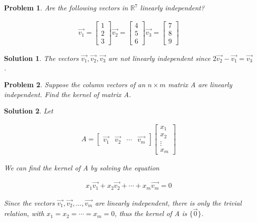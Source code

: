 \documentclass{article}
\newtheorem{problem}{Problem}
\newtheorem*{solution}{Solution}
\begin{document}
\begin{problem}
Are the following vectors in $\mathbb{R}^7$ linearly independent?

\begin{align*}
\vec{v_{1}} = \begin{bmatrix} 1 \\ 2 \\ 3 \end{bmatrix}
\vec{v_{2}} = \begin{bmatrix} 4 \\ 5 \\ 6 \end{bmatrix}
\vec{v_{3}} = \begin{bmatrix} 7 \\ 8 \\ 9 \end{bmatrix}
\end{align*}
\end{problem}

\begin{solution}
The vectors $\vec{v_{1}}, \vec{v_{2}}, \vec{v_{3}}$ are not linearly independent since $2\vec{v_{2}} - \vec{v_{1}} = \vec{v_{3}}$.
\end{solution}

\begin{problem}
Suppose the column vectors of an $n \times m$ matrix A are linearly independent. Find the kernel of matrix A.
\end{problem}

\begin{solution}
Let 

\begin{align*} 
A = \begin{bmatrix} \vec{v_{1}} & \vec{v_{2}} & \cdots & \vec{v_{m}} \end{bmatrix} \begin{bmatrix} x_{1} \\ x_{2} \\ \vdots \\ x_{m} \end{bmatrix}
\end{align*}

We can find the kernel of A by solving the equation 

\begin{align*} 
x_{1} \vec{v_{1}} + x_{2} \vec{v_{2}} + \cdots + x_{m} \vec{v_{m}} = 0
\end{align*}

Since the vectors $\vec{v_{1}}, \vec{v_{2}}, \ldots, \vec{v_{m}}$ are linearly independent, there is only the trivial relation, with $x_{1} = x_{2} = \cdots = x_{m} = 0$, thus the kernel of A is $\{\vec{0}\}$.

\end{solution}
\end{document}
